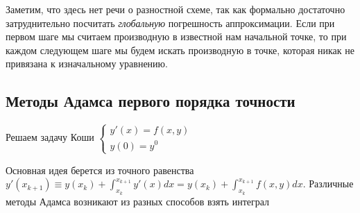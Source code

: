\begin{remark}
  Заметим, что здесь нет речи о разностной схеме, так как формально достаточно
  затруднительно посчитать \textit{глобальную} погрешность аппроксимации.
  Если при первом шаге мы считаем производную в известной нам начальной точке,
  то при каждом следующем шаге мы будем искать производную в точке, которая
  никак не привязана к изначальному уравнению.
\end{remark}

\subsection*{Методы Адамса первого порядка точности}

Решаем задачу Коши $\begin{cases}
    y'(x)=f(x,y) \\ y(0)=y^0
  \end{cases}$

Основная идея берется из точного равенства $y'(x_{k+1})\equiv y(x_k)+\int_{x_k}^{x_{k+1}}y'(x)dx=y(x_k)+\int_{x_k}^{x_{k+1}}f(x,y)dx$.
Различные методы Адамса возникают из разных способов взять интеграл

